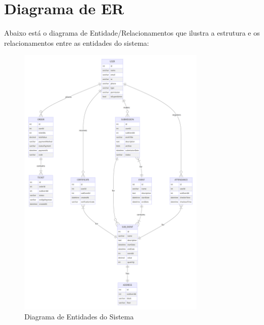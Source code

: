 \section{Diagrama de ER}

Abaixo está o diagrama de Entidade/Relacionamentos que ilustra a estrutura e os relacionamentos entre as entidades do sistema:

\begin{figure}[h]
\centering
\includegraphics[width=0.8\textwidth]{figuras/diagrama-entidades.png}
\caption{Diagrama de Entidades do Sistema}
\label{fig:diagrama-entidades.png}
\end{figure}

